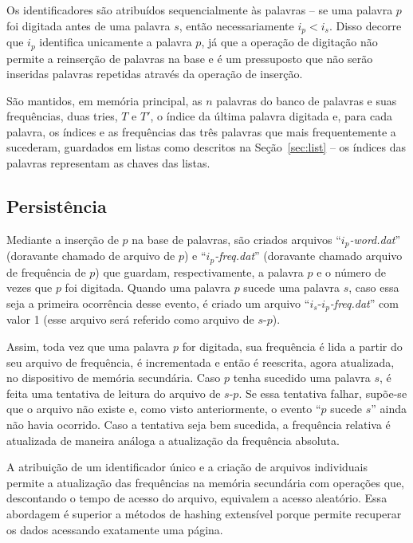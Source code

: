 \documentclass[12pt]{article}
\begin{document}
    Os identificadores são atribuídos sequencialmente às palavras -- se uma palavra $p$ foi digitada antes de uma palavra $s$, então necessariamente $i_p < i_s$.
    Disso decorre que $i_p$ identifica unicamente a palavra $p$, já que a operação de digitação não permite a reinserção de palavras na base e é um pressuposto que não serão inseridas palavras repetidas através da operação de inserção.

    São mantidos, em memória principal, as $n$ palavras do banco de palavras e suas frequências, duas tries, $T$ e $T'$, o índice da última palavra digitada e, para cada palavra, os índices e as frequências das três palavras que mais frequentemente a sucederam, guardados em listas como descritos na Seção~\ref{sec:list} -- os índices das palavras representam as chaves das listas.

    \subsection{Persistência} \label{sec:pers}
    Mediante a inserção de $p$ na base de palavras, são criados arquivos ``$i_p$\emph{-word.dat}'' (doravante chamado de arquivo de $p$) e ``$i_p$\emph{-freq.dat}'' (doravante chamado arquivo de frequência de $p$) que guardam, respectivamente, a palavra $p$ e o número de vezes que $p$ foi digitada.
    Quando uma palavra $p$ sucede uma palavra $s$, caso essa seja a primeira ocorrência desse evento, é criado um arquivo ``$i_s$-$i_p$\emph{-freq.dat}'' com valor 1 (esse arquivo será referido como arquivo de $s$-$p$).

    Assim, toda vez que uma palavra $p$ for digitada, sua frequência é lida a partir do seu arquivo de frequência, é incrementada e então é reescrita, agora atualizada, no dispositivo de memória secundária.
    Caso $p$ tenha sucedido uma palavra $s$, é feita uma tentativa de leitura do arquivo de $s$-$p$.
    Se essa tentativa falhar, supõe-se que o arquivo não existe e, como visto anteriormente, o evento ``$p$ sucede $s$'' ainda não havia ocorrido.
    Caso a tentativa seja bem sucedida, a frequência relativa é atualizada de maneira análoga a atualização da frequência absoluta.

    A atribuição de um identificador único e a criação de arquivos individuais permite a atualização das frequências na memória secundária com operações que, descontando o tempo de acesso do arquivo, equivalem a acesso aleatório.
    Essa abordagem é superior a métodos de hashing extensível porque permite recuperar os dados acessando exatamente uma página.
\end{document}
